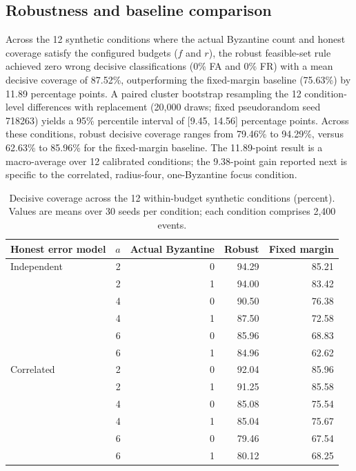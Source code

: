 \subsection{Robustness and baseline comparison}
Across the 12 synthetic conditions where the actual Byzantine count and honest coverage satisfy the configured budgets ($f$ and $r$), the robust feasible-set rule achieved zero wrong decisive classifications (0\% FA and 0\% FR) with a mean decisive coverage of 87.52\%, outperforming the fixed-margin baseline (75.63\%) by 11.89 percentage points. A paired cluster bootstrap resampling the 12 condition-level differences with replacement (20,000 draws; fixed pseudorandom seed 718263) yields a 95\% percentile interval of [9.45, 14.56] percentage points. Across these conditions, robust decisive coverage ranges from 79.46\% to 94.29\%, versus 62.63\% to 85.96\% for the fixed-margin baseline. The 11.89-point result is a macro-average over 12 calibrated conditions; the 9.38-point gain reported next is specific to the correlated, radius-four, one-Byzantine focus condition.

\begin{table}[htbp]\centering\footnotesize
\caption{Decisive coverage across the 12 within-budget synthetic conditions (percent). Values are means over 30 seeds per condition; each condition comprises 2,400 events.}\label{tab:twelve}
\begin{tabular}{lrrrr}\toprule
Honest error model&$a$&Actual Byzantine&Robust&Fixed margin\\\midrule
Independent&2&0&94.29&85.21\\
&2&1&94.00&83.42\\
&4&0&90.50&76.38\\
&4&1&87.50&72.58\\
&6&0&85.96&68.83\\
&6&1&84.96&62.62\\
Correlated&2&0&92.04&85.96\\
&2&1&91.25&85.58\\
&4&0&85.08&75.54\\
&4&1&85.04&75.67\\
&6&0&79.46&67.54\\
&6&1&80.12&68.25\\
\bottomrule
\end{tabular}\end{table}




